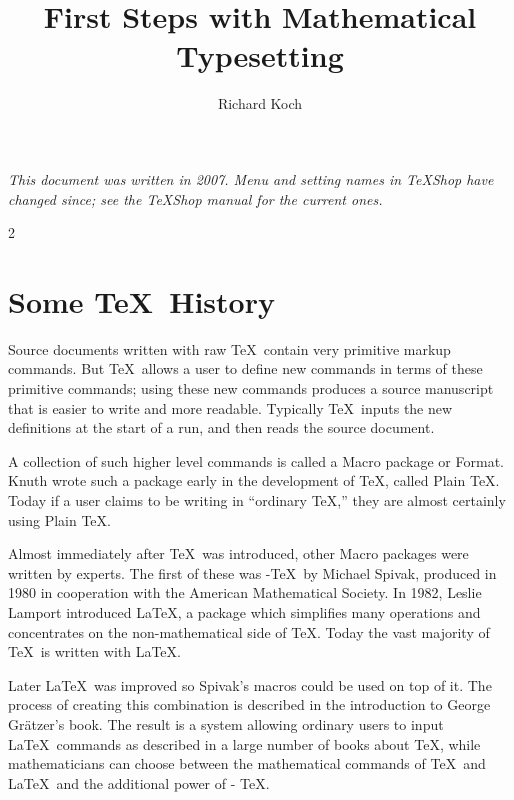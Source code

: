 \documentclass[11pt, oneside]{amsart}
\title{First Steps with Mathematical Typesetting }
\author{Richard Koch}
\begin{document}
\maketitle
\noindent\textit{This document was written in 2007. Menu and setting names in TeXShop have changed since; see the TeXShop manual for the current ones.}

\begin{multicols}{2}

\section{Some \TeX\ History}
\thispagestyle{empty}

Source documents written with raw \TeX\ contain very primitive markup commands. But  \TeX\ allows a user to define new commands in terms of these primitive commands; using these new commands produces a source manuscript that is easier to write and more readable.
Typically \TeX\ inputs the new definitions at the start of a run, and then reads the source document.

A collection of such higher level commands is called a Macro package or Format. Knuth wrote such a package early in the development of \TeX, called Plain \TeX. Today if a user claims to be writing in ``ordinary \TeX,'' they are almost certainly using Plain \TeX.

Almost immediately after \TeX\ was introduced, other Macro packages were written by experts. The first of these was \AmS-\TeX\ by Michael Spivak, produced in 1980 in cooperation with the American Mathematical Society. In 1982, Leslie Lamport introduced \LaTeX, a package which simplifies many operations and concentrates on the non-mathematical side of \TeX. Today the vast majority of \TeX\ is written with \LaTeX.

Later \LaTeX\ was improved so Spivak's macros could be used on top of it. The process of creating this combination is described in the introduction to George Gr\"atzer's book. The result is a system allowing ordinary users to input \LaTeX\ commands as described in a large number of books about \TeX, while mathematicians can choose between the mathematical commands of \TeX\ and \LaTeX\ and the additional power of \AmS- \TeX.


\end{multicols}
\end{document}
